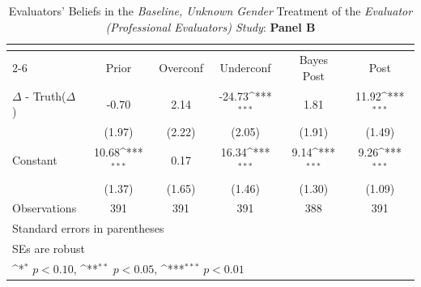 \begin{table}[htbp]\centering
\def\sym#1{\ifmmode^{#1}\else\(^{#1}\)\fi}
\caption{Evaluators' Beliefs in the \textit{Baseline, Unknown Gender} Treatment of the \textit{Evaluator (Professional Evaluators) Study}: \textbf{Panel B}}
\begin{tabular}{l*{5}{c}}
\hline\hline
                &\multicolumn{5}{c}{}                                                                          \\\cmidrule(lr){2-6}
                &\multicolumn{1}{c}{Prior}&\multicolumn{1}{c}{Overconf}&\multicolumn{1}{c}{Underconf}&\multicolumn{1}{c}{Bayes Post}&\multicolumn{1}{c}{Post}\\
\hline
$\Delta$ - Truth($\Delta$)&    -0.70         &     2.14         &   -24.73\sym{***}&     1.81         &    11.92\sym{***}\\
                &   (1.97)         &   (2.22)         &   (2.05)         &   (1.91)         &   (1.49)         \\
Constant        &    10.68\sym{***}&     0.17         &    16.34\sym{***}&     9.14\sym{***}&     9.26\sym{***}\\
                &   (1.37)         &   (1.65)         &   (1.46)         &   (1.30)         &   (1.09)         \\
\hline
Observations    &      391         &      391         &      391         &      388         &      391         \\
\hline\hline
\multicolumn{6}{l}{\footnotesize Standard errors in parentheses}\\
\multicolumn{6}{l}{\footnotesize SEs are robust}\\
\multicolumn{6}{l}{\footnotesize \sym{*} \(p<0.10\), \sym{**} \(p<0.05\), \sym{***} \(p<0.01\)}\\
\end{tabular}
\end{table}
